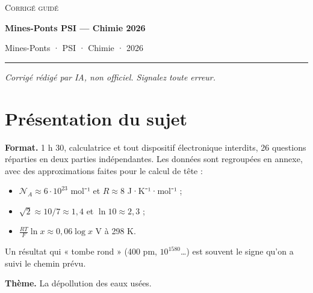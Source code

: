 \documentclass[11pt,a4paper]{article}
\providecommand{\tightlist}{\setlength{\itemsep}{0pt}\setlength{\parskip}{0pt}}
\begin{document}
\thispagestyle{plain}
\begin{center}
  {\small\scshape Corrigé guidé}\par\smallskip
  {\LARGE\bfseries Mines-Ponts PSI — Chimie 2026\par}\medskip
  {\large Mines-Ponts · PSI · Chimie · 2026\par}
\end{center}
\vspace{2pt}\hrule\vspace{8pt}

\emph{Corrigé rédigé par IA, non officiel. Signalez toute erreur.}

\hypertarget{pruxe9sentation-du-sujet}{%
\section{Présentation du sujet}\label{pruxe9sentation-du-sujet}}

\textbf{Format.} 1 h 30, calculatrice et tout dispositif électronique interdits, 26 questions réparties en deux parties indépendantes. Les données sont regroupées en annexe, avec des approximations faites pour le calcul de tête :

\begin{itemize}
\tightlist
\item
  \({\mathcal{N}}_A\approx6\cdot10^{23}\) mol⁻¹ et \(R\approx8\) J·K⁻¹·mol⁻¹ ;
\item
  \(\sqrt2\approx10/7\approx1{,}4\) et \(\ln10\approx2{,}3\) ;
\item
  \(\frac{RT}{F}\ln x\approx0{,}06\log x\) V à 298 K.
\end{itemize}

Un résultat qui « tombe rond » (400 pm, \(10^{1580}\)\ldots) est souvent le signe qu'on a suivi le chemin prévu.

\textbf{Thème.} La dépollution des eaux usées.
\end{document}
